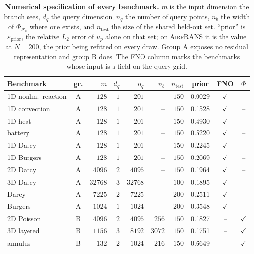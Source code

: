 \documentclass{article}
\begin{document}
\begin{table}[t]
\centering
\caption{\textbf{Numerical specification of every benchmark.} $m$ is the input dimension the branch
sees, $d_q$ the query dimension, $n_q$ the number of query points, $n_b$ the width of
$\Phi_{\mathcal{F}_0}$ where one exists, and $n_{\mathrm{test}}$ the size of the shared held-out
set. ``prior'' is $\varepsilon_{\mathrm{prior}}$, the relative $L_2$ error of $u_p$ alone on that
set; on \textsc{AirfRANS} it is the value at $N=200$, the prior being refitted on every draw. Group
A exposes no residual representation and group B does. The FNO column marks the benchmarks whose
input is a field on the query grid.}
\label{tab:app-e1-spec}
\footnotesize
\setlength{\tabcolsep}{8pt}
\renewcommand{\arraystretch}{0.7}
\begin{tabular}{lcrrrrr ccc}
\toprule
Benchmark & gr. & $m$ & $d_q$ & $n_q$ & $n_b$ & $n_{\mathrm{test}}$ & prior & FNO & $\Phi$\\
\midrule
1D nonlin.\ reaction & A & $128$ & $1$ & $201$ & -- & $150$ & 0.0029 & $\checkmark$ & --\\
1D convection & A & $128$ & $1$ & $201$ & -- & $150$ & 0.1528 & $\checkmark$ & --\\
1D heat & A & $128$ & $1$ & $201$ & -- & $150$ & 0.4930 & $\checkmark$ & --\\
battery & A & $128$ & $1$ & $201$ & -- & $150$ & 0.5220 & $\checkmark$ & --\\
1D Darcy & A & $128$ & $1$ & $201$ & -- & $150$ & 0.2245 & $\checkmark$ & --\\
1D Burgers & A & $128$ & $1$ & $201$ & -- & $150$ & 0.2069 & $\checkmark$ & --\\
2D Darcy & A & $4096$ & $2$ & $4096$ & -- & $150$ & 0.1964 & $\checkmark$ & --\\
3D Darcy & A & $32768$ & $3$ & $32768$ & -- & $100$ & 0.1895 & $\checkmark$ & --\\
Darcy \citep{li2020fourier} & A & $7225$ & $2$ & $7225$ & -- & $200$ & 0.2511 & $\checkmark$ & --\\
Burgers \citep{li2020fourier} & A & $1024$ & $1$ & $1024$ & -- & $200$ & 0.3548 & $\checkmark$ & --\\
2D Poisson & B & $4096$ & $2$ & $4096$ & $256$ & $150$ & 0.1827 & -- & $\checkmark$\\
3D layered & B & $1156$ & $3$ & $8192$ & $3072$ & $150$ & 0.1751 & -- & $\checkmark$\\
annulus & B & $132$ & $2$ & $1024$ & $216$ & $150$ & 0.6649 & -- & $\checkmark$\\

\end{tabular}
\end{table}
\end{document}
